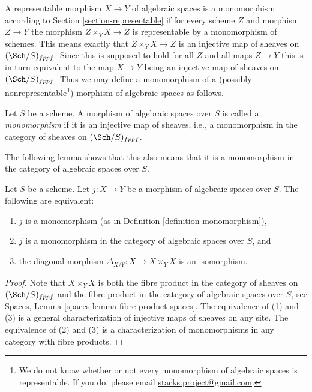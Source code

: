 \noindent
A representable morphism $X \to Y$ of algebraic spaces is a monomorphism
according to Section \ref{section-representable} if for every scheme
$Z$ and morphism $Z \to Y$ the morphism $Z \times_Y X \to Z$
is representable by a monomorphism of schemes.
This means exactly that $Z \times_Y X \to Z$
is an injective map of sheaves on $(\Sch/S)_{fppf}$. Since this
is supposed to hold for all $Z$ and all maps $Z \to Y$ this is in turn
equivalent to the map $X \to Y$ being an injective map of sheaves on
$(\Sch/S)_{fppf}$. Thus we may define a monomorphism of a (possibly
nonrepresentable\footnote{We do not know whether or not every monomorphism
of algebraic spaces is representable. If you do, please email
\href{mailto:stacks.project@gmail.com}{stacks.project@gmail.com}.})
morphism of algebraic spaces as follows.

\begin{definition}
\label{definition-monomorphism}
Let $S$ be a scheme.
A morphism of algebraic spaces over $S$ is called a {\it monomorphism}
if it is an injective map of sheaves, i.e., a monomorphism in the category
of sheaves on $(\Sch/S)_{fppf}$.
\end{definition}

\noindent
The following lemma shows that this also means that it is a monomorphism
in the category of algebraic spaces over $S$.

\begin{lemma}
\label{lemma-monomorphism}
Let $S$ be a scheme.
Let $j : X \to Y$ be a morphism of algebraic spaces over $S$.
The following are equivalent:
\begin{enumerate}
\item $j$ is a monomorphism (as in Definition \ref{definition-monomorphism}),
\item $j$ is a monomorphism in the category of algebraic spaces over $S$, and
\item the diagonal morphism $\Delta_{X/Y} : X \to X \times_Y X$ is
an isomorphism.
\end{enumerate}
\end{lemma}

\begin{proof}
Note that $X \times_Y X$ is both the fibre product in the category of
sheaves on $(\Sch/S)_{fppf}$ and the fibre product in the category
of algebraic spaces over $S$, see
Spaces, Lemma \ref{spaces-lemma-fibre-product-spaces}.
The equivalence of (1) and (3) is a general characterization
of injective maps of sheaves on any site.
The equivalence of (2) and (3) is a characterization of monomorphisms
in any category with fibre products.
\end{proof}

